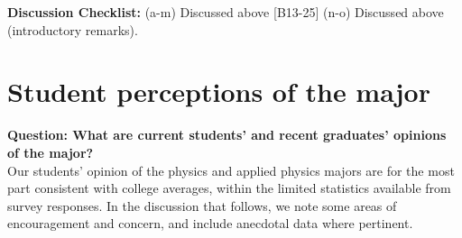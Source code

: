 \documentclass[12pt]{article}
\begin{document}
\noindent
{\bf Discussion Checklist:}
(a-m) Discussed above [B13-25] (n-o) Discussed above (introductory remarks).

\newpage
\section{Student perceptions of the major}
\label{sec:perceptions}

{\bf Question: What are current students' and recent graduates' opinions of the major? }\\

Our students' opinion of the physics and applied physics majors are
for the most part consistent with college averages, within the limited
statistics available from survey responses.  In the discussion that follows,
we note some areas of encouragement and concern, and include anecdotal
data where pertinent.\\[3pt]

\end{document}
